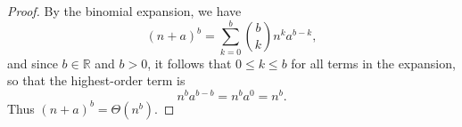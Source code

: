 
\begin{proof}
    By the binomial expansion, we have
    \[
        {(n + a)}^b = \sum_{k=0}^b \binom{b}{k} n^k a^{b - k},
    \]
    and since $b \in \mathbb{R}$ and $b > 0$, it follows that $0 \leq k \leq b$ for
    all terms in the expansion, so that the highest-order term is
    \[
        n^ba^{b - b} = n^b a^0 = n^b.
    \]
    Thus ${(n + a)}^b = \Theta(n^b)$.
\end{proof}
